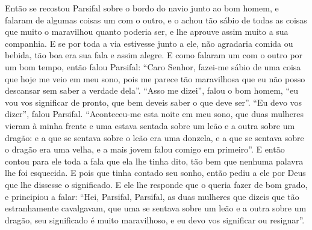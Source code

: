 Então se recostou Parsifal sobre o bordo do navio junto ao bom homem, e
falaram de algumas coisas um com o outro, e o achou tão sábio de todas as
coisas que muito o maravilhou quanto poderia ser, e lhe aprouve assim muito a
sua companhia. E se por toda a via estivesse junto a ele, não agradaria comida
ou bebida, tão boa era sua fala e assim alegre. E como falaram um com
o outro por um bom tempo, então falou Parsifal: “Caro Senhor, fazei-me sábio
de uma coisa que hoje me veio em meu sono, pois me parece tão maravilhosa que
eu não posso descansar sem saber a verdade dela”. “Asso me dizei”, falou o bom
homem, “eu vou vos significar de pronto, que bem deveis saber o que deve ser”.
“Eu devo vos dizer”, falou Parsifal. “Aconteceu-me esta noite em meu sono, que
duas mulheres vieram à minha frente e uma estava sentada sobre um leão e a
outra sobre um dragão: e a que se sentava sobre o leão era uma donzela, e a que
se sentava sobre o dragão era uma velha, e a mais jovem falou comigo em
primeiro”. E então contou para ele toda a fala que ela lhe tinha dito, tão bem
que nenhuma palavra lhe foi esquecida. E pois que tinha contado seu sonho,
então pediu a ele por Deus que lhe dissesse o significado. E ele lhe responde
que o queria fazer de bom grado, e principiou a falar: “Hei, Parsifal,
Parsifal, as duas mulheres que dizeis que tão estranhamente cavalgavam, que
uma se sentava sobre um leão e a outra sobre um dragão, seu significado é muito
maravilhoso, e eu devo vos significar ou resignar”.

